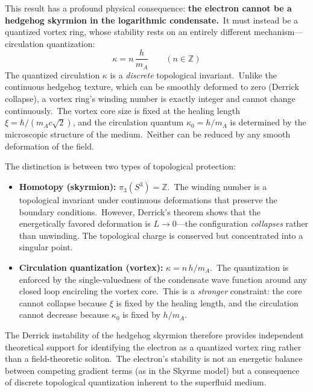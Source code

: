 ﻿\documentclass[12pt,letterpaper]{article}
\begin{document}
This result has a profound physical consequence: \textbf{the electron cannot be a
hedgehog skyrmion in the logarithmic condensate.}\ It must instead be a quantized
vortex ring, whose stability rests on an entirely different mechanism---circulation
quantization:
%
\begin{equation}
  \kappa = n\,\frac{h}{m_A} \qquad (n \in \mathbb{Z})
\end{equation}
%
The quantized circulation $\kappa$ is a \emph{discrete} topological invariant.\ Unlike
the continuous hedgehog texture, which can be smoothly deformed to zero (Derrick
collapse), a vortex ring's winding number is exactly integer and cannot change
continuously.\ The vortex core size is fixed at the healing length
$\xi = \hbar/(m_A c\sqrt{2})$, and the circulation quantum $\kappa_0 = h/m_A$ is
determined by the microscopic structure of the medium.\ Neither can be reduced
by any smooth deformation of the field.

The distinction is between two types of topological protection:
%
\begin{itemize}[leftmargin=2em]
  \item \textbf{Homotopy (skyrmion):} $\pi_3(S^3) = \mathbb{Z}$.\ The winding number
    is a topological invariant under continuous deformations that preserve the boundary
    conditions.\ However, Derrick's theorem shows that the energetically favored
    deformation is $L \to 0$---the configuration \emph{collapses} rather than unwinding.
    The topological charge is conserved but concentrated into a singular point.

  \item \textbf{Circulation quantization (vortex):} $\kappa = n\,h/m_A$.\ The
    quantization is enforced by the single-valuedness of the condensate wave function
    around any closed loop encircling the vortex core.\ This is a \emph{stronger}
    constraint: the core cannot collapse because $\xi$ is fixed by the healing length,
    and the circulation cannot decrease because $\kappa_0$ is fixed by $h/m_A$.
\end{itemize}
%
The Derrick instability of the hedgehog skyrmion therefore provides independent
theoretical support for identifying the electron as a quantized vortex ring rather
than a field-theoretic soliton.\ The electron's stability is not an energetic
balance between competing gradient terms (as in the Skyrme model) but a consequence
of discrete topological quantization inherent to the superfluid medium.
\end{document}
